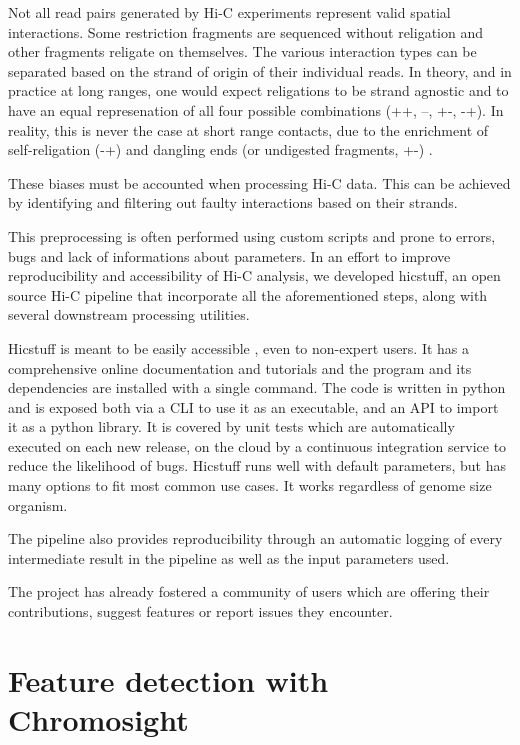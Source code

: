 Not all read pairs generated by Hi-C experiments represent valid spatial interactions. Some restriction fragments are sequenced without religation and other fragments religate on themselves. The various interaction types can be separated based on the strand of origin of their individual reads. In theory, and in practice at long ranges, one would expect religations to be strand agnostic and to have an equal represenation of all four possible combinations (++, --, +-, -+). In reality, this is never the case at short range contacts, due to the enrichment of self-religation (-+) and dangling ends (or undigested fragments, +-) \cite{cournacNormalizationChromosomalContact2012}.

These biases must be accounted when processing Hi-C data. This can be achieved by identifying and filtering out faulty interactions based on their strands.

This preprocessing is often performed using custom scripts and prone to errors, bugs and lack of informations about parameters. In an effort to improve reproducibility and accessibility of Hi-C analysis, we developed hicstuff, an open source Hi-C pipeline that incorporate all the aforementioned steps, along with several downstream processing utilities.

Hicstuff is meant to be easily accessible \cite{matthey-doretSimpleLibraryPipeline2021}, even to non-expert users. It has a comprehensive online documentation and tutorials and the program and its dependencies are installed with a single command. The code is written in python and is exposed both via a \acrfull{CLI} to use it as an executable, and an \acrfull{API} to import it as a python library. It is covered by unit tests which are automatically executed on each new release, on the cloud by a continuous integration service to reduce the likelihood of bugs. Hicstuff runs well with default parameters, but has many options to fit most common use cases. It works regardless of genome size organism.

The pipeline also provides reproducibility through an automatic logging of every intermediate result in the pipeline as well as the input parameters used.

The project has already fostered a community of users which are offering their contributions, suggest features or report issues they encounter.

\section{Feature detection with Chromosight}

